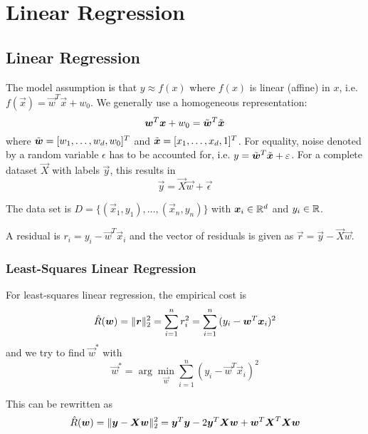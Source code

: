 \chapter{Linear Regression}


\section{Linear Regression}
The model assumption is that $y \approx f(x)$ where $f(x)$ is
linear (affine) in $x$,
i.e. $f(\vec{x}) = \vec{w}^T \vec{x} + w_0$.
We generally use a homogeneous representation:
\begin{equation*}
\vec{w}^T \vec{x} + w_0 = \Tilde{\vec{w}}^T \Tilde{\vec{x}}
\end{equation*}
where $\Tilde{\vec{w}} = [w_1, \dotsc, w_d, w_0]^T$ and
$\Tilde{\vec{x}} = [x_1, \dotsc, x_d, 1]^T$.
For equality, noise denoted by a random variable $\epsilon$
has to be accounted for, i.e.
$y = \Tilde{\vec{w}}^T \Tilde{\vec{x}} + \epsilon$.
For a complete dataset $\vec{X}$ with labels $\vec{y}$,
this results in
\begin{equation*}
\vec{y} = \vec{X} \vec{w} + \vec{\epsilon}
\end{equation*}

The data set is $D = \{(\vec{x}_1, y_1), \dotsc, (\vec{x}_n, y_n)\}$
with $\vec{x}_i \in \R^d$ and $y_i \in \R$.

A residual is $r_i = y_i - \vec{w}^T \vec{x}_i$ and the
vector of residuals is given as
$\vec{r} = \vec{y} - \vec{X}\vec{w}$.

\subsection{Least-Squares Linear Regression}
For least-squares linear regression, the empirical cost is
\begin{equation*}
\hat{R}(\vec{w}) = \norm{\vec{r}}_2^2
= \sum_{i = 1}^n{r_i^2}
= \sum_{i = 1}^n{(y_i - \vec{w}^T \vec{x}_i)^2}
\end{equation*}
and we try to find $\vec{w}^*$ with
\begin{equation*}
\vec{w}^* = \arg\min_{\vec{w}}{
	\sum_{i = 1}^n{(y_i - \vec{w}^T \vec{x}_i)^2}
}
\end{equation*}

This can be rewritten as
\begin{equation*}
\hat{R}(\vec{w})
= \norm{\vec{y} - \vec{X}\vec{w}}_2^2
= \vec{y}^T \vec{y} - 2 \vec{y}^T \vec{X} \vec{w} + \vec{w}^T \vec{X}^T \vec{X} \vec{w}
\end{equation*}

